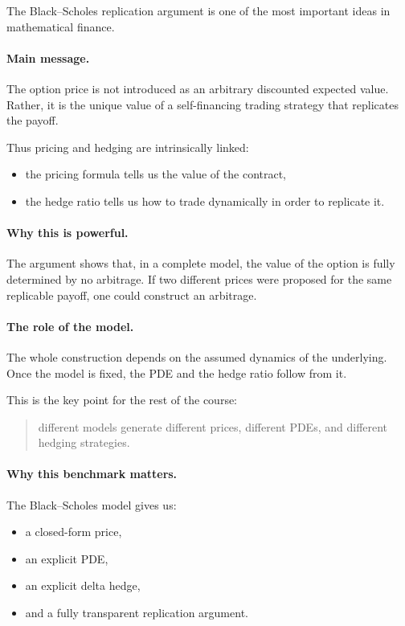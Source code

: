 \documentclass[11pt]{article}
\theoremstyle{plain}
\theoremstyle{definition}
\theoremstyle{remark}
\begin{document}
The Black--Scholes replication argument is one of the most important
ideas in mathematical finance.

\paragraph{Main message.}
The option price is not introduced as an arbitrary discounted expected
value.
Rather, it is the unique value of a self-financing trading strategy that
replicates the payoff.

Thus pricing and hedging are intrinsically linked:
\begin{itemize}[leftmargin=1.4em]
    \item the pricing formula tells us the value of the contract,
    \item the hedge ratio tells us how to trade dynamically in order to
    replicate it.
\end{itemize}

\paragraph{Why this is powerful.}
The argument shows that, in a complete model, the value of the option is
fully determined by no arbitrage.
If two different prices were proposed for the same replicable payoff,
one could construct an arbitrage.

\paragraph{The role of the model.}
The whole construction depends on the assumed dynamics of the
underlying.
Once the model is fixed, the PDE and the hedge ratio follow from it.

This is the key point for the rest of the course:
\begin{quote}
different models generate different prices, different PDEs, and
different hedging strategies.
\end{quote}

\paragraph{Why this benchmark matters.}
The Black--Scholes model gives us:
\begin{itemize}[leftmargin=1.4em]
    \item a closed-form price,
    \item an explicit PDE,
    \item an explicit delta hedge,
    \item and a fully transparent replication argument.
\end{itemize}
\end{document}
